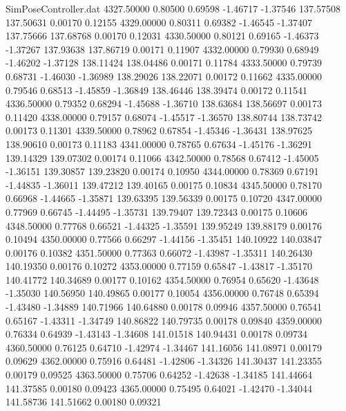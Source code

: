 \begin{filecontents}{SimPoseController.dat}
4327.50000    0.80500    0.69598    -1.46717   -1.37546  137.57508  137.50631    0.00170    0.12155
4329.00000    0.80311    0.69382    -1.46545   -1.37407  137.75666  137.68768    0.00170    0.12031
4330.50000    0.80121    0.69165    -1.46373   -1.37267  137.93638  137.86719    0.00171    0.11907
4332.00000    0.79930    0.68949    -1.46202   -1.37128  138.11424  138.04486    0.00171    0.11784
4333.50000    0.79739    0.68731    -1.46030   -1.36989  138.29026  138.22071    0.00172    0.11662
4335.00000    0.79546    0.68513    -1.45859   -1.36849  138.46446  138.39474    0.00172    0.11541
4336.50000    0.79352    0.68294    -1.45688   -1.36710  138.63684  138.56697    0.00173    0.11420
4338.00000    0.79157    0.68074    -1.45517   -1.36570  138.80744  138.73742    0.00173    0.11301
4339.50000    0.78962    0.67854    -1.45346   -1.36431  138.97625  138.90610    0.00173    0.11183
4341.00000    0.78765    0.67634    -1.45176   -1.36291  139.14329  139.07302    0.00174    0.11066
4342.50000    0.78568    0.67412    -1.45005   -1.36151  139.30857  139.23820    0.00174    0.10950
4344.00000    0.78369    0.67191    -1.44835   -1.36011  139.47212  139.40165    0.00175    0.10834
4345.50000    0.78170    0.66968    -1.44665   -1.35871  139.63395  139.56339    0.00175    0.10720
4347.00000    0.77969    0.66745    -1.44495   -1.35731  139.79407  139.72343    0.00175    0.10606
4348.50000    0.77768    0.66521    -1.44325   -1.35591  139.95249  139.88179    0.00176    0.10494
4350.00000    0.77566    0.66297    -1.44156   -1.35451  140.10922  140.03847    0.00176    0.10382
4351.50000    0.77363    0.66072    -1.43987   -1.35311  140.26430  140.19350    0.00176    0.10272
4353.00000    0.77159    0.65847    -1.43817   -1.35170  140.41772  140.34689    0.00177    0.10162
4354.50000    0.76954    0.65620    -1.43648   -1.35030  140.56950  140.49865    0.00177    0.10054
4356.00000    0.76748    0.65394    -1.43480   -1.34889  140.71966  140.64880    0.00178    0.09946
4357.50000    0.76541    0.65167    -1.43311   -1.34749  140.86822  140.79735    0.00178    0.09840
4359.00000    0.76334    0.64939    -1.43143   -1.34608  141.01518  140.94431    0.00178    0.09734
4360.50000    0.76125    0.64710    -1.42974   -1.34467  141.16056  141.08971    0.00179    0.09629
4362.00000    0.75916    0.64481    -1.42806   -1.34326  141.30437  141.23355    0.00179    0.09525
4363.50000    0.75706    0.64252    -1.42638   -1.34185  141.44664  141.37585    0.00180    0.09423
4365.00000    0.75495    0.64021    -1.42470   -1.34044  141.58736  141.51662    0.00180    0.09321

\end{filecontents}
